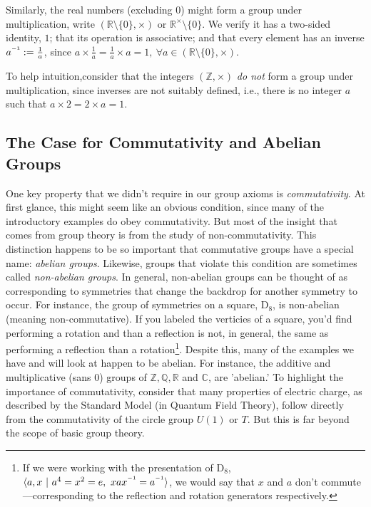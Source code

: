 \documentclass[11pt, a4paper]{report}
\newcommand{\inv}{^{\raisebox{.2em}{$\scriptscriptstyle-1$}}}
\newcommand{\integers}{\mathbb{Z}}
\newcommand{\rationals}{\mathbb{Q}}
\newcommand{\reals}{\mathbb{R}}
\newcommand{\complexes}{\mathbb{C}}
\begin{document}
 Similarly, the real numbers (excluding 0) might form a group under multiplication, write $(\reals\setminus\lbrace 0 \rbrace, \times)$ or $\reals^{\times}\setminus\lbrace 0 \rbrace$. 
We verify it has a two-sided identity, $1$; that its operation is associative; and that every element has an inverse $a\inv := \frac{1}{a}$, since $a\times \frac{1}{a} = \frac{1}{a} \times a = 1, \ \forall  a \in  (\reals\setminus\lbrace 0 \rbrace, \times)$. 
 
 To help intuition,consider that the integers $(\mathbb{Z},\times)$  \textit{do not} form a group under multiplication, since inverses are not suitably defined, i.e., there is no integer $a$ such that $a\times 2 = 2 \times a = 1$.

\subsection{The Case for Commutativity and Abelian Groups}
One key property that we didn't require in our group axioms is \textit{commutativity}. At first glance, this might seem like an obvious condition, since many of the introductory examples do obey commutativity. But most of the insight that comes from group theory is from the study of non-commutativity. This distinction happens to be so important that commutative groups have a special name: \textit{abelian groups}.\autocite[17]{dummit} Likewise, groups that violate this condition are sometimes called \textit{non-abelian groups}. In general, non-abelian groups can be thought of as corresponding to symmetries that change the backdrop for another symmetry to occur. For instance, the group of symmetries on a square, $\mathrm{D}_{8}$, is non-abelian (meaning non-commutative). If you labeled the verticies of a square, you'd find performing a rotation and than a reflection is not, in general, the same as performing a reflection than a rotation\footnote[0]{If we were working with the presentation of $\mathrm{D}_8$, $\langle a,x\ \vert \ a^4 = x^2 = e,\ xax\inv = a\inv \rangle$, we would say that $x$ and $a$ don't commute—corresponding to the reflection and rotation generators respectively.}. Despite this, many of the examples we have and will look at happen to be abelian. For instance, the additive and multiplicative (sans $0$) groups of $\integers, \rationals, \reals$ and $\complexes$, are  'abelian.' To highlight the importance of commutativity, consider that many properties of electric charge, as described by the Standard Model (in Quantum Field Theory), follow directly from the commutativity of the circle group $U(1)$ or $T$.\autocite{weinberg} But this is far beyond the scope of basic group theory.
\end{document}

